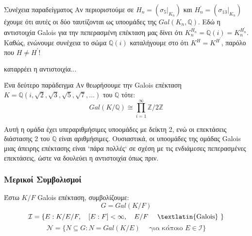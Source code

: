\documentclass{beamer}
\newcommand {\tl}{\textlatin}
\begin{document}
\begin{frame}
    \begin{block}{Συνέχεια παραδείγματος}
        Αν περιοριστούμε σε $H_n = (\sigma_5|_{K_n}) $ και $H^{\prime}_n = (\sigma_{13}|_{K_n})$ έχουμε ότι αυτές οι δύο ταυτίζονται ως υποομάδες της $Gal(K_n, \mathbb{Q})$. Εδώ η αντιστοιχία \tl{Galois} για την πεπερασμένη επέκταση μας δίνει ότι $K^{H_n}_n = \mathbb Q (i) = K^{H^{\prime}_n}_n$. Καθώς, ενώνουμε συνέχεια το σώμα $\mathbb Q (i)$ καταλήγουμε στο ότι $K^H = K^{H^{\prime}}$, παρόλο που $H \neq H^{\prime}$!
    \end{block}
    καταρρέει η αντιστοιχία...
\end{frame}
\begin{frame}
\begin{block}{Ένα δεύτερο παράδειγμα}
    Αν θεωρήσουμε την \tl{Galois} επέκταση $K = \mathbb Q (i, \sqrt 2 , \sqrt 3 , \sqrt 5 , \sqrt 7 , \ldots)$ του $\mathbb Q$ τότε:
	$$Gal(K/\mathbb{Q}) \cong \prod \limits_{i=1}^{\infty} \mathbb Z / 2 \mathbb Z$$
\end{block}
\pause
    Αυτή η ομάδα έχει υπεραριθμήσιμες υποομάδες με δείκτη 2, ενώ οι επεκτάσεις διάστασης 2 του $\mathbb{Q}$ είναι αριθμήσιμες. Ουσιαστικά, οι υποομάδες της ομάδας \tl{Galois} μιας άπειρης επέκτασης είναι `πάρα πολλές` σε σχέση με τις ενδιάμεσες πεπερασμένες επεκτάσεις, ώστε να δουλεύει η αντιστοιχία όπως πριν.
\end{frame}



\begin{frame}
    \frametitle{Μερικοί Συμβολισμοί}
    Έστω $K/F$ \tl{Galois} επέκταση, συμβολίζουμε:
    $$G=Gal(K/F)$$
    $$\mathcal{I} = \{ E: K/E/F , \quad [E:F]<\infty , \quad E/F \quad\text{ \tl{Galois} } \}$$
    $$\mathcal{N} = \{N \subseteq G: N = Gal(K/E) \quad\text{ για κάποιo } E \in \mathcal{I} \}$$
\end{frame}
\end{document}
